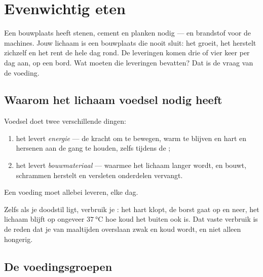 \chapter{Evenwichtig eten}\label{ch:g3:balanced-diet}

Een bouwplaats heeft stenen, cement en planken nodig --- en brandstof
voor de machines. Jouw lichaam is een bouwplaats die nooit sluit: het
groeit, het herstelt zichzelf en het rent de hele dag rond. De
leveringen komen drie of vier keer per dag aan, op een bord. Wat moeten
die leveringen bevatten? Dat is de vraag van de voeding.

\section{Waarom het lichaam voedsel nodig heeft}

\begin{proposition}\label{prop:g3:balanced-diet:jobs}
Voedsel doet twee verschillende dingen:
\begin{enumerate}
  \item het levert \emph{energie} --- de
        kracht om te bewegen, warm te blijven en hart en hersenen aan
        de gang te houden, zelfs tijdens de ;
  \item het levert \emph{bouwmateriaal} --- waarmee het lichaam langer
        wordt,  en  bouwt, schrammen herstelt en versleten
        onderdelen vervangt.
\end{enumerate}
Een voeding moet allebei leveren, elke dag.
\end{proposition}
\admitted

\begin{example}\label{ex:g3:balanced-diet:rest}
Zelfs als je doodstil ligt, verbruik je : het hart klopt, de
borst gaat op en neer, het lichaam blijft op ongeveer
$\qty{37}{\degreeCelsius}$ hoe koud het buiten ook is. Dat vaste
verbruik is de reden dat je van maaltijden overslaan zwak en koud
wordt, en niet alleen hongerig.
\end{example}

\section{De voedingsgroepen}

